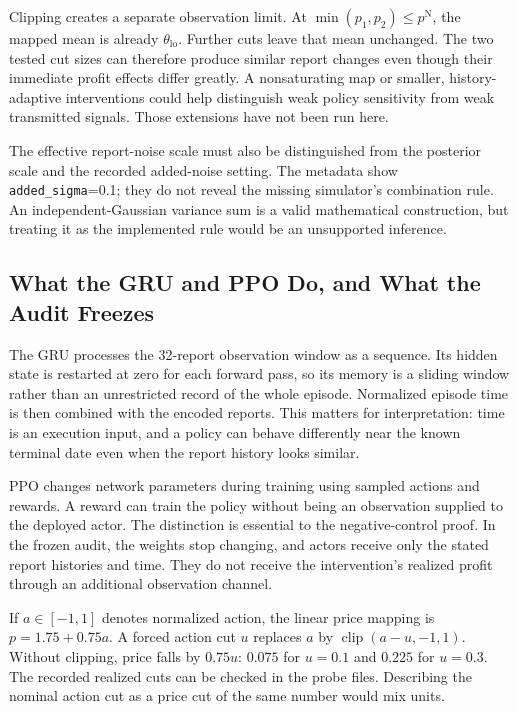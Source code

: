 \documentclass{article}
\begin{document}
Clipping creates a separate observation limit. At $\min(p_1,p_2)\le p^{\mathrm N}$, the mapped mean is already $\theta_{\mathrm{lo}}$. Further cuts leave that mean unchanged. The two tested cut sizes can therefore produce similar report changes even though their immediate profit effects differ greatly. A nonsaturating map or smaller, history-adaptive interventions could help distinguish weak policy sensitivity from weak transmitted signals. Those extensions have not been run here.

The effective report-noise scale must also be distinguished from the posterior scale and the recorded added-noise setting. The metadata show \texttt{added\_sigma}=0.1; they do not reveal the missing simulator's combination rule. An independent-Gaussian variance sum is a valid mathematical construction, but treating it as the implemented rule would be an unsupported inference.

\subsection{What the GRU and PPO Do, and What the Audit Freezes}

The GRU processes the 32-report observation window as a sequence. Its hidden state is restarted at zero for each forward pass, so its memory is a sliding window rather than an unrestricted record of the whole episode. Normalized episode time is then combined with the encoded reports. This matters for interpretation: time is an execution input, and a policy can behave differently near the known terminal date even when the report history looks similar.

PPO changes network parameters during training using sampled actions and rewards. A reward can train the policy without being an observation supplied to the deployed actor. The distinction is essential to the negative-control proof. In the frozen audit, the weights stop changing, and actors receive only the stated report histories and time. They do not receive the intervention's realized profit through an additional observation channel.

If $a\in[-1,1]$ denotes normalized action, the linear price mapping is $p=1.75+0.75a$. A forced action cut $u$ replaces $a$ by $\operatorname{clip}(a-u,-1,1)$. Without clipping, price falls by $0.75u$: $0.075$ for $u=0.1$ and $0.225$ for $u=0.3$. The recorded realized cuts can be checked in the probe files. Describing the nominal action cut as a price cut of the same number would mix units.
\end{document}
